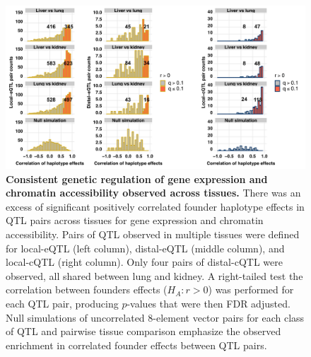 \documentclass[10pt,letterpaper,twoside]{article}
\begin{document}
\begin{figure}[hp]
\renewcommand{\familydefault}{\sfdefault}\normalfont
\centering
\includegraphics[width=\textwidth, trim={0in 0in 0in 0in}, clip]{figs/qtl_pair_cor_histograms.png}
\caption{\textbf{Consistent genetic regulation of gene expression and chromatin accessibility observed across tissues.} 
There was an excess of significant positively correlated founder haplotype effects in QTL pairs across tissues for gene expression and chromatin accessibility. Pairs of QTL observed in multiple tissues were defined for local-eQTL (left column), distal-eQTL (middle column), and local-cQTL (right column). Only four pairs of distal-cQTL were observed, all shared between lung and kidney. A right-tailed test the correlation between founders effects ($H_{A}: r > 0$) was performed for each QTL pair, producing $p$-values that were then FDR adjusted. Null simulations of uncorrelated 8-element vector pairs for each class of QTL and pairwise tissue comparison emphasize the observed enrichment in correlated founder effects between QTL pairs.  
\label{fig:qtl_pair_histograms}}
\end{figure}

\clearpage
\end{document}
